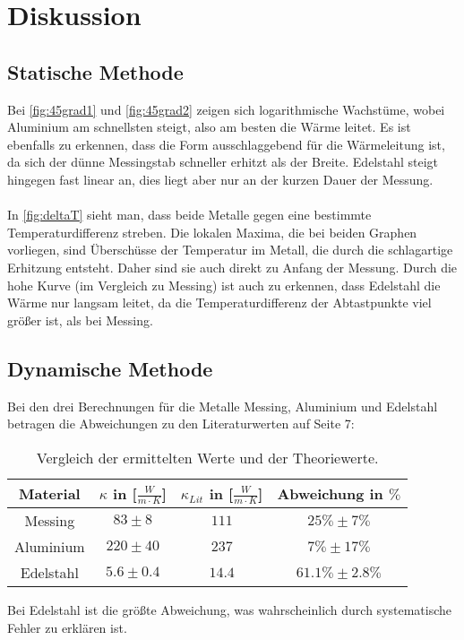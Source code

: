 \section{Diskussion}
\label{sec:Diskussion}

\subsection{Statische Methode}
Bei \autoref{fig:45grad1} und \autoref{fig:45grad2} zeigen sich logarithmische Wachstüme, wobei Aluminium am schnellsten steigt, also am besten die Wärme leitet.
Es ist ebenfalls zu erkennen, dass die Form ausschlaggebend für die Wärmeleitung ist, da sich der dünne Messingstab schneller erhitzt als der Breite.
Edelstahl steigt hingegen fast linear an, dies liegt aber nur an der kurzen Dauer der Messung.
\\
\
\\
In \autoref{fig:deltaT} sieht man, dass beide Metalle gegen eine bestimmte Temperaturdifferenz streben.
Die lokalen Maxima, die bei beiden Graphen vorliegen, sind Überschüsse der Temperatur im Metall, die durch die schlagartige Erhitzung entsteht.
Daher sind sie auch direkt zu Anfang der Messung.
Durch die hohe Kurve (im Vergleich zu Messing) ist auch zu erkennen, dass Edelstahl die Wärme nur langsam leitet, da die Temperaturdifferenz der Abtastpunkte viel größer ist, als bei Messing.
\subsection{Dynamische Methode}
Bei den drei Berechnungen für die Metalle Messing, Aluminium und Edelstahl betragen die Abweichungen zu den Literaturwerten auf Seite 7:

\begin{table}
    \centering
    \caption{Vergleich der ermittelten Werte und der Theoriewerte.}
    \label{tab:lasttab}
    \begin{tabular}{c|c|c|c}
        \toprule
        Material & $\kappa$ in [$\frac{W}{m\cdot K}$] & $\kappa_{Lit}$ in [$\frac{W}{m\cdot K}$] & Abweichung in $\%$\\
        \midrule
        Messing & $83\pm 8$ & $111$ & $25\% \pm 7\%$\\
        Aluminium & $220\pm 40$ & $237$ &  $7\% \pm 17\%$\\
        Edelstahl & $5.6\pm 0.4$ & $14.4$ & $61.1\% \pm 2.8\%$\\
        \bottomrule
    \end{tabular}
\end{table}

Bei Edelstahl ist die größte Abweichung, was wahrscheinlich durch systematische Fehler zu erklären ist.